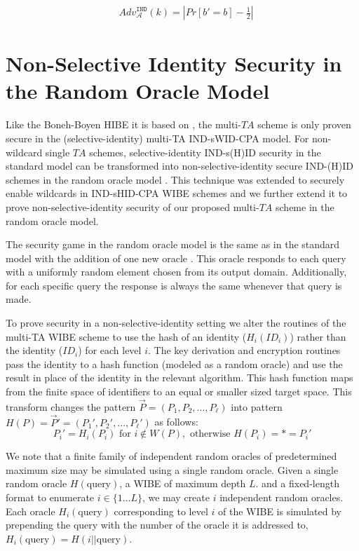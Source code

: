 \documentclass[10pt]{llncs}
\newcommand{\A}{\mathcal{A}}
\newcommand{\ID}{\mathit{ID}}
\newcommand{\TA}{\mathit{TA}}
\newcommand{\adv}[2]{\mathit{Adv}_{#1}^{\texttt{#2}}}
\begin{document}
\begin{eqnarray*}
	& \adv{\A}{IND}(k) = |Pr[b' = b] - \frac{1}{2}|
\end{eqnarray*}

\section{Non-Selective Identity Security in the Random Oracle Model}

Like the Boneh-Boyen HIBE it is based on \cite{Boneh04}, the multi-$\TA$ scheme is only proven secure in the (selective-identity) multi-TA IND-sWID-CPA model. For non-wildcard single $\TA$ schemes, selective-identity IND-s(H)ID security in the standard model can be transformed into non-selective-identity secure IND-(H)ID schemes in the random oracle model \cite{Boneh05}. This technique was extended to securely enable wildcards in IND-sHID-CPA WIBE schemes \cite{Abdalla06} and we further extend it to prove non-selective-identity security of our proposed multi-$\TA$ scheme in the random oracle model.

The security game in the random oracle model is the same as in the standard model with the addition of one new oracle \cite{Bellare93}. This oracle responds to each query with a uniformly random element chosen from its output domain. Additionally, for each specific query the response is always the same whenever that query is made. 

To prove security in a non-selective-identity setting we alter the routines of the multi-TA WIBE scheme to use the hash of an identity ($H_i(\ID_i)$) rather than the identity ($\ID_i$) for each level $i$.  The key derivation and encryption routines pass the identity to a hash function (modeled as a random oracle) and use the result in place of the identity in the relevant algorithm. This hash function maps from the finite space of identifiers to an equal or smaller sized target space. This transform changes the pattern $\vec{P} = (P_1, P_2, ..., P_\ell)$ into pattern $H(P) = \vec{P}' = (P_1', P_2', ..., P_\ell')$ as follows:
$$P_i' = H_i(P_i) \textrm{ for } i \notin W(P), \textrm{ otherwise } H(P_i) = * = P_i'$$

We note that a finite family of independent random oracles of predetermined maximum size may be simulated using a single random oracle. Given a single random oracle $H(\textrm{query})$, a WIBE of maximum depth $L$. and a fixed-length format to enumerate $i \in \{1 \ldots L\}$, we may create $i$ independent random oracles. Each oracle $H_i(\textrm{query})$ corresponding to level $i$ of the WIBE is simulated by prepending the query with the number of the oracle it is addressed to, $H_i(\textrm{query}) = H(i || \textrm{query})$.
\end{document}
